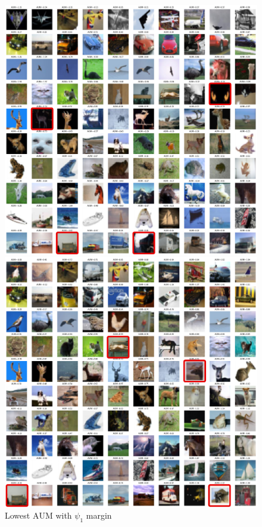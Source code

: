 \begin{figure}[thb]
    \centering
    \begin{minipage}{0.45\textwidth}
        \centering
        \includegraphics[width=\linewidth]{images/aum_pleiss.pdf}
        \caption{Lowest $\mathrm{AUM}$ with $\psi_1$ margin}
        \label{fig:AUM_pleiss}
    \end{minipage}
    \hfill
    \begin{minipage}{0.45\textwidth}
        \centering
        \includegraphics[width=\linewidth]{images/aum_yang.pdf}

\end{minipage}
\end{figure}
